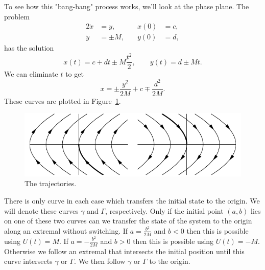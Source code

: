 \begin{Solution}
  To see how this "bang-bang" process works, we'll look at the phase plane.
  The problem
  \begin{alignat*}{2}
    \dot{x} &= y, &\quad x(0) &= c, \\
    \dot{y} &= \pm M, &\quad y(0) &= d,
  \end{alignat*}
  has the solution
  \[
  x(t) = c + d t \pm M \frac{t^2}{2}, \qquad
  y(t) = d \pm M t.
  \]
  We can eliminate $t$ to get
  \[
  x = \pm \frac{y^2}{2 M} + c \mp \frac{d^2}{2 M}.
  \]
  These curves are plotted in Figure~\ref{hw4p3p1}.

  \begin{figure}[h!]
    \begin{center}
      \includegraphics[width=\textwidth]{cv/cv/hw4p3p1}
    \end{center}
    \caption{The trajectories.}
    \label{hw4p3p1}
  \end{figure}

  There is only curve in each case which transfers the initial state to 
  the origin.  We will denote these curves $\gamma$ and $\Gamma$, respectively.
  Only if the initial point $(a,b)$ lies on one of these two curves can we 
  transfer the state of the system to the origin along an extremal without
  switching.  If $a = \frac{b^2}{2M}$ and $b < 0$ then this is possible using
  $U(t) = M$.  If $a = - \frac{b^2}{2M}$ and $b > 0$ then this is possible 
  using $U(t) = - M$.  Otherwise we follow an extremal that intersects the
  initial position until this curve intersects $\gamma$ or $\Gamma$.  We then
  follow $\gamma$ or $\Gamma$ to the origin.
\end{Solution}



